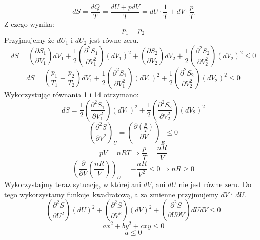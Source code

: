 \documentclass{article}
\begin{document}
		\begin{equation}
		dS = \frac{dQ}{T} = \frac{dU + pdV}{T} = dU \cdot\frac{1}{T} + dV \cdot \frac{p}{T}
		\end{equation}	
		Z czego wynika:
		\begin{equation}
		p_1 = p_2
		\end{equation}
		Przyjmujemy że $ dU_1 $ i $ dU_2 $ jest równe zeru.
		\begin{equation}
		dS = (\frac{\partial S_1}{\partial V_1})dV_1 +
		 \frac{1}{2}(\frac{\partial ^2S_1}{\partial V_1^2})(dV_1)^2 +
		 (\frac{\partial S_2}{\partial V_2})dV_2 +
		 \frac{1}{2}(\frac{\partial ^2S_2}{\partial V_2^2})(dV_2)^2 \leqslant 0
		\end{equation}
		\begin{equation}
		dS = (\frac{p_1}{T_1} - \frac{p_2}{T_2})dV_1 +
		\frac{1}{2}(\frac{\partial ^2S_1}{\partial V_1^2})(dV_1)^2 +
		\frac{1}{2}(\frac{\partial ^2S_2}{\partial V_2^2})(dV_2)^2 \leqslant 0
		\end{equation}
		Wykorzystując równania 1 i 14 otrzymano:
		\begin{equation}
			dS = \frac{1}{2}(\frac{\partial ^2S_1}{\partial V_1^2})(dV_1)^2 +
				\frac{1}{2}(\frac{\partial ^2S_2}{\partial V_2^2})(dV_2)^2
		\end{equation}
		\begin{equation}
		(\frac{\partial ^2S}{\partial V^2})_U =
		 (\frac{\partial(\frac{p}{T})}{\partial V})_E \leqslant 0
		\end{equation}
		\begin{equation}
		pV=nRT \Rightarrow \frac{p}{T} = \frac{nR}{V}
		\end{equation}
		\begin{equation}
		(\frac{\partial}{\partial V}(\frac{nR}{V}))_U = -\frac{nR}{V^2} \leqslant 0 \Rightarrow nR \geqslant 0
		\end{equation}
		Wykorzystajmy teraz sytuację, w której ani $ dV $, ani $ dU $ nie jest równe zeru. Do tego wykorzystamy funkcje kwadratową, a za zmienne przyjmujemy $dV$ i $dU$.
		\begin{equation}
		(\frac{\partial ^ 2S}{\partial U^2})(dU)^2 + 
		(\frac{\partial ^ 2S}{\partial V^2})(dV)^2 +
		(\frac{\partial ^ 2S}{\partial U \partial V})dUdV \leqslant 0  
		\end{equation}
		\begin{equation}
		ax^2 + by^2 + cxy \leqslant 0 
		\end{equation}
		\begin{equation}
		a \leqslant 0
		\end{equation}
\end{document}
